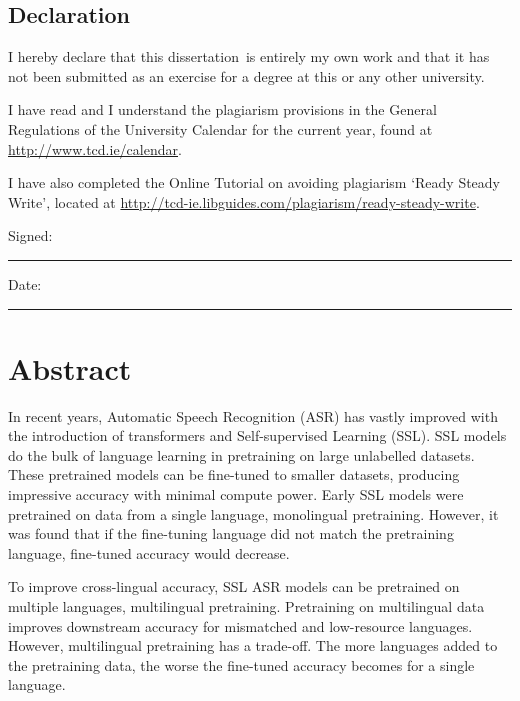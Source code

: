 \documentclass[a4paper,oneside,12pt]{book}
\title{\thesistitle}
\author{\authorname}
\newcommand{\typeofthesis}{dissertation} %
\numberwithin{equation}{chapter} %
\begin{document}

\section*{\Huge{Declaration}}
\vspace{1cm}
I hereby declare that this \typeofthesis\ is entirely my own work and that it has not been submitted as an exercise for a degree at this or any other university.

\vspace{1cm}
I have read and I understand the plagiarism provisions in the General Regulations of the University Calendar for the current year, found at \url{http://www.tcd.ie/calendar}.
\vspace{1cm}

I have also completed the Online Tutorial on avoiding plagiarism `Ready Steady Write', located at \url{http://tcd-ie.libguides.com/plagiarism/ready-steady-write}.
\vspace{3cm}

Signed:~\rule{5cm}{0.3pt}\hfill Date:~\rule{5cm}{0.3pt}

\chapter*{Abstract}

In recent years, Automatic Speech Recognition (ASR) has vastly improved with the introduction of transformers and Self-supervised Learning (SSL). SSL models do the bulk of language learning in pretraining on large unlabelled datasets. These pretrained models can be fine-tuned to smaller datasets, producing impressive accuracy with minimal compute power. Early SSL models were pretrained on data from a single language, monolingual pretraining. However, it was found that if the fine-tuning language did not match the pretraining language, fine-tuned accuracy would decrease. 

To improve cross-lingual accuracy, SSL ASR models can be pretrained on multiple languages, multilingual pretraining. Pretraining on multilingual data improves downstream accuracy for mismatched and low-resource languages. However, multilingual pretraining has a trade-off. The more languages added to the pretraining data, the worse the fine-tuned accuracy becomes for a single language. 
\end{document}
